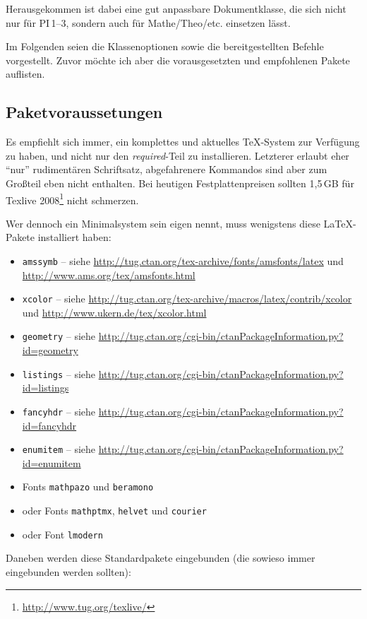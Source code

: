 \documentclass[nicefonts,nogruppe,nosemester,noveranstaltung,notutor,noabgabe,utf]{uhb-inf-tex}
\begin{document}
Herausgekommen ist dabei eine gut anpassbare Dokumentklasse, die sich nicht nur für PI\,1--3, sondern auch für Mathe/Theo/etc. einsetzen lässt.

Im Folgenden seien die Klassenoptionen sowie die bereitgestellten Befehle vorgestellt. Zuvor möchte ich aber die vorausgesetzten und empfohlenen Pakete auflisten.

\subsection{Paketvoraussetungen}

Es empfiehlt sich immer, ein komplettes und aktuelles \TeX-System zur Verfügung zu haben, und nicht nur den \textit{required}-Teil zu installieren. Letzterer erlaubt eher "`nur"' rudimentären Schriftsatz, abgefahrenere Kommandos sind aber zum Großteil eben nicht enthalten. Bei heutigen Festplattenpreisen sollten 1,5\,GB für Texlive 2008\footnote{\url{http://www.tug.org/texlive/}} nicht schmerzen.

Wer dennoch ein Minimalsystem sein eigen nennt, muss wenigstens diese \LaTeX-Pakete installiert haben:

\begin{itemize}
	\item \texttt{amssymb} -- siehe \url{http://tug.ctan.org/tex-archive/fonts/amsfonts/latex} und \url{http://www.ams.org/tex/amsfonts.html}
	\item \texttt{xcolor} -- siehe \url{http://tug.ctan.org/tex-archive/macros/latex/contrib/xcolor} und \url{http://www.ukern.de/tex/xcolor.html}
	\item \texttt{geometry} -- siehe \url{http://tug.ctan.org/cgi-bin/ctanPackageInformation.py?id=geometry}
	\item \texttt{listings} -- siehe \url{http://tug.ctan.org/cgi-bin/ctanPackageInformation.py?id=listings}
	\item \texttt{fancyhdr} -- siehe \url{http://tug.ctan.org/cgi-bin/ctanPackageInformation.py?id=fancyhdr}
	\item \texttt{enumitem} -- siehe \url{http://tug.ctan.org/cgi-bin/ctanPackageInformation.py?id=enumitem}
	\item Fonts \texttt{mathpazo} und \texttt{beramono}
	\item oder Fonts \texttt{mathptmx}, \texttt{helvet} und \texttt{courier}
	\item oder Font \texttt{lmodern}
\end{itemize}

Daneben werden diese Standardpakete eingebunden (die sowieso immer eingebunden werden sollten):
\end{document}

